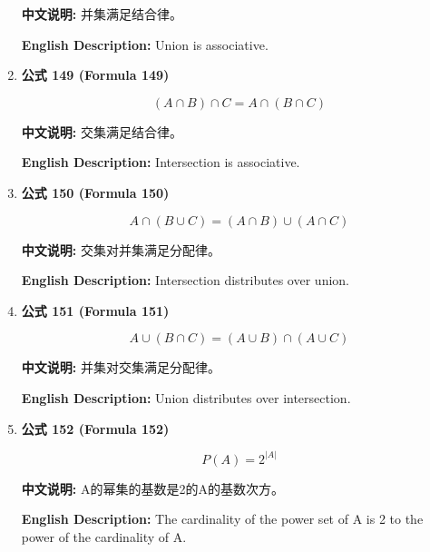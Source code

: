 \documentclass[12pt,a4paper]{article}
\begin{document}
\begin{enumerate}[leftmargin=*]
\textbf{中文说明:} 并集满足结合律。

\textbf{English Description:} Union is associative.

\vspace{0.5cm}

\item \textbf{公式 149 (Formula 149)}

\begin{equation}
(A \cap B) \cap C = A \cap (B \cap C)
\end{equation}

\textbf{中文说明:} 交集满足结合律。

\textbf{English Description:} Intersection is associative.

\vspace{0.5cm}

\item \textbf{公式 150 (Formula 150)}

\begin{equation}
A \cap (B \cup C) = (A \cap B) \cup (A \cap C)
\end{equation}

\textbf{中文说明:} 交集对并集满足分配律。

\textbf{English Description:} Intersection distributes over union.

\vspace{0.5cm}

\item \textbf{公式 151 (Formula 151)}

\begin{equation}
A \cup (B \cap C) = (A \cup B) \cap (A \cup C)
\end{equation}

\textbf{中文说明:} 并集对交集满足分配律。

\textbf{English Description:} Union distributes over intersection.

\vspace{0.5cm}

\item \textbf{公式 152 (Formula 152)}

\begin{equation}
P(A) = 2^{|A|}
\end{equation}

\textbf{中文说明:} A的幂集的基数是2的A的基数次方。

\textbf{English Description:} The cardinality of the power set of A is 2 to the power of the cardinality of A.

\vspace{0.5cm}


\end{enumerate}
\end{document}
